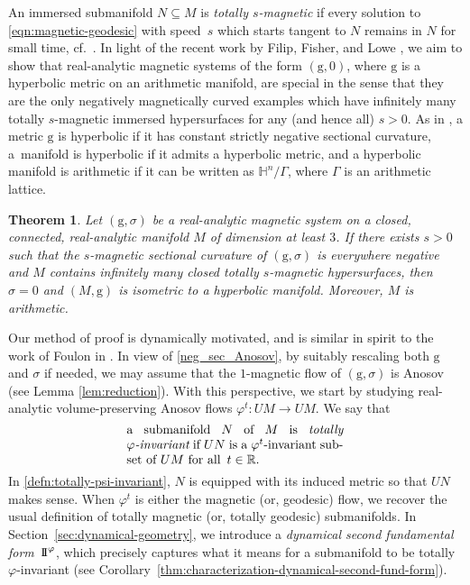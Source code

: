 \documentclass[10pt,a4paper]{amsart}
\newcommand{\g}{\mathrm{g}}
\newcommand{\R}{\mathbb{R}}
\numberwithin{equation}{section}
\newtheorem{theoremA}{Theorem}
\theoremstyle{definition}
\begin{document}
An immersed submanifold $N \subseteq M$ is \emph{totally $s$-magnetic} if every solution to \eqref{eqn:magnetic-geodesic} with speed~$s$ which starts tangent to $N$ remains in $N$ for small time, cf.\ \cite[Definition 6.5]{ABM_2025}. In light of the recent work by Filip, Fisher, and Lowe \cite[Theorem 1]{filip2024finiteness}, we aim to show that real-analytic magnetic systems of the form $(\g, 0)$, where $\g$ is a hyperbolic metric on an arithmetic manifold, are special in the sense that they are the only negatively magnetically curved examples which have infinitely many totally $s$-magnetic immersed hypersurfaces for any (and hence all) $s > 0$. As in \cite{filip2024finiteness}, a metric $\g$ is hyperbolic if it has constant strictly negative sectional curvature, a~manifold is hyperbolic if it admits a hyperbolic metric, and a hyperbolic manifold is arithmetic if it can be written as $\mathbb{H}^n/\Gamma$, where $\Gamma$ is an arithmetic lattice.


\begin{theoremA} \label{thm:magnetic-finiteness}
 Let $(\g, \sigma)$ be a real-analytic magnetic system on a closed, connected, real-analytic manifold $M$ of dimension at least $3$. If there exists $s > 0$ such that the $s$-magnetic sectional curvature of $(\g, \sigma)$ is everywhere negative and $M$ contains infinitely many closed totally \mbox{$s$-magnetic}
 hypersurfaces, then $\sigma = 0$ and $(M,\g)$ is isometric to a hyperbolic manifold. Moreover, $M$ is arithmetic.
\end{theoremA}


Our method of proof is dynamically motivated, and is similar in spirit to the work of Foulon in \cite{foulon}. In view of \eqref{neg_sec_Anosov}, by suitably rescaling both $\g$ and $\sigma$ if needed, we may assume that the $1$-magnetic flow of $(\g, \sigma)$ is Anosov (see Lemma \ref{lem:reduction}). With this perspective, we start by studying
real-analytic volume-preserving Anosov flows $\varphi^t \colon UM \rightarrow UM$. We say that
\begin{equation}\label{defn:totally-psi-invariant}
 \parbox{.5\textwidth}{a submanifold $N$ of $M$ is \emph{totally \mbox{$\varphi$-in\-va\-ri\-ant}} if $UN$ is a $\varphi^t$-invariant subset of $UM$ for all $\,t\in \R$.}
\end{equation}
In \eqref{defn:totally-psi-invariant}, $N$ is equipped with its induced metric so that $UN$ makes sense.
When $\varphi^t$ is either the magnetic (or, geodesic) flow, we recover the usual definition of totally magnetic (or, totally geodesic) submanifolds.
In Section~\ref{sec:dynamical-geometry}, we introduce a \emph{dynamical second fundamental form}~${\rm I\!I}^\varphi$, which precisely captures what it means for a submanifold to be totally $\varphi$-invariant (see Corollary~\ref{thm:characterization-dynamical-second-fund-form}).
\end{document}
